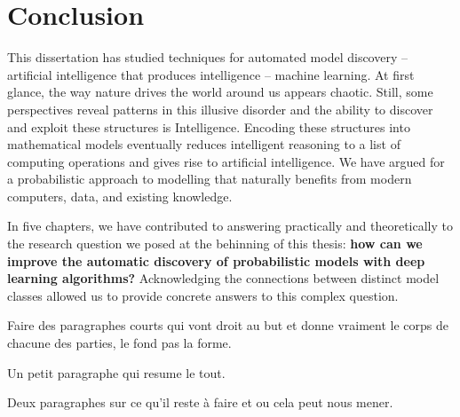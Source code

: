 \chapter{Conclusion}\label{ch:08}
This dissertation has studied techniques for automated model discovery -- artificial intelligence that produces intelligence -- machine learning. At first glance, the way nature drives the world around us appears chaotic. Still, some perspectives reveal patterns in this illusive disorder and the ability to discover and exploit these structures is Intelligence. Encoding these structures into mathematical models eventually reduces intelligent reasoning to a list of computing operations and gives rise to artificial intelligence. We have argued for a probabilistic approach to modelling that naturally benefits from modern computers, data, and existing knowledge.

In five chapters, we have contributed to answering practically and theoretically to the research question we posed at the behinning of this thesis: \textbf{how can we improve the automatic discovery of probabilistic models with deep learning algorithms?} Acknowledging the connections between distinct model classes allowed us to provide concrete answers to this complex question.



Faire des paragraphes courts qui vont droit au but et donne vraiment le corps de chacune des parties, le fond pas la forme.

Un petit paragraphe qui resume le tout.

Deux paragraphes sur ce qu'il reste à faire et ou cela peut nous mener.
%
%
%
%
%
%
%
%
%

